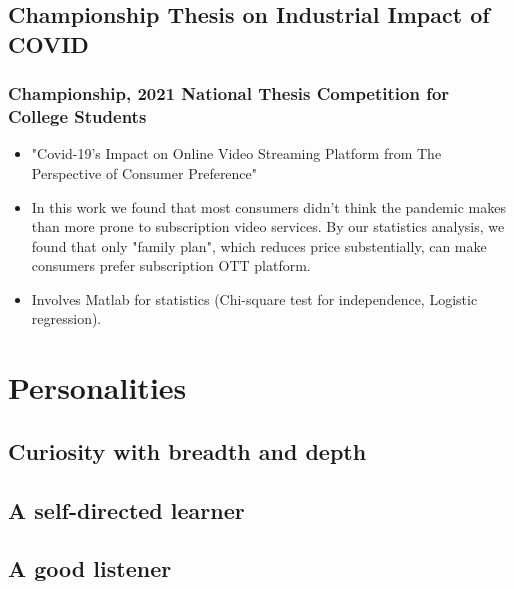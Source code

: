 \documentclass[compress]{beamer}
\begin{document}
\subsection{Championship Thesis on Industrial Impact of COVID}
\begin{frame}
    \frametitle{Championship, 2021 National Thesis Competition for College Students}
    \begin{itemize}
        \item "Covid-19's Impact on Online Video Streaming Platform from The Perspective of Consumer Preference"
        \item In this work we found that most consumers didn't think the pandemic makes than more prone to subscription video services. By our statistics analysis, we found that only "family plan", which reduces price substentially, can make consumers prefer subscription OTT platform.
        \item Involves Matlab for statistics (Chi-square test for independence,
              Logistic regression).
    \end{itemize}
\end{frame}




\section{Personalities}
\subsection{Curiosity with breadth and depth}
\subsection{A self-directed learner}
\subsection{A good listener}
\end{document}
